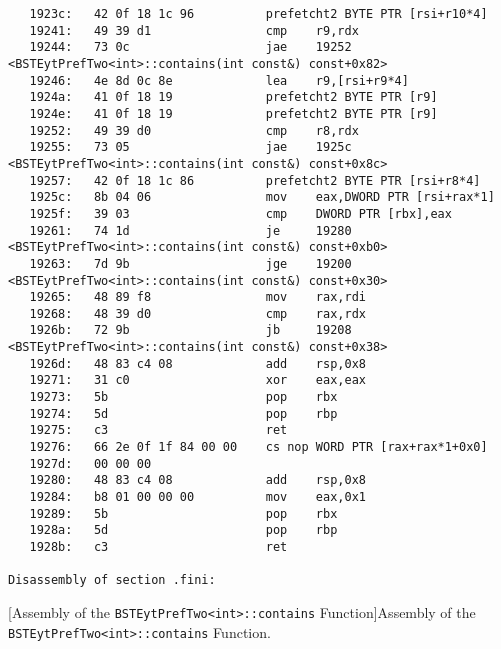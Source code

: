 \begin{lstlisting}
   1923c:	42 0f 18 1c 96       	prefetcht2 BYTE PTR [rsi+r10*4]
   19241:	49 39 d1             	cmp    r9,rdx
   19244:	73 0c                	jae    19252 <BSTEytPrefTwo<int>::contains(int const&) const+0x82>
   19246:	4e 8d 0c 8e          	lea    r9,[rsi+r9*4]
   1924a:	41 0f 18 19          	prefetcht2 BYTE PTR [r9]
   1924e:	41 0f 18 19          	prefetcht2 BYTE PTR [r9]
   19252:	49 39 d0             	cmp    r8,rdx
   19255:	73 05                	jae    1925c <BSTEytPrefTwo<int>::contains(int const&) const+0x8c>
   19257:	42 0f 18 1c 86       	prefetcht2 BYTE PTR [rsi+r8*4]
   1925c:	8b 04 06             	mov    eax,DWORD PTR [rsi+rax*1]
   1925f:	39 03                	cmp    DWORD PTR [rbx],eax
   19261:	74 1d                	je     19280 <BSTEytPrefTwo<int>::contains(int const&) const+0xb0>
   19263:	7d 9b                	jge    19200 <BSTEytPrefTwo<int>::contains(int const&) const+0x30>
   19265:	48 89 f8             	mov    rax,rdi
   19268:	48 39 d0             	cmp    rax,rdx
   1926b:	72 9b                	jb     19208 <BSTEytPrefTwo<int>::contains(int const&) const+0x38>
   1926d:	48 83 c4 08          	add    rsp,0x8
   19271:	31 c0                	xor    eax,eax
   19273:	5b                   	pop    rbx
   19274:	5d                   	pop    rbp
   19275:	c3                   	ret
   19276:	66 2e 0f 1f 84 00 00 	cs nop WORD PTR [rax+rax*1+0x0]
   1927d:	00 00 00 
   19280:	48 83 c4 08          	add    rsp,0x8
   19284:	b8 01 00 00 00       	mov    eax,0x1
   19289:	5b                   	pop    rbx
   1928a:	5d                   	pop    rbp
   1928b:	c3                   	ret

Disassembly of section .fini:

\end{lstlisting}
[Assembly of the \texttt{BSTEytPrefTwo<int>::contains} Function]{Assembly of the \texttt{BSTEytPrefTwo<int>::contains} Function.}
\label{lst:asm-pref}